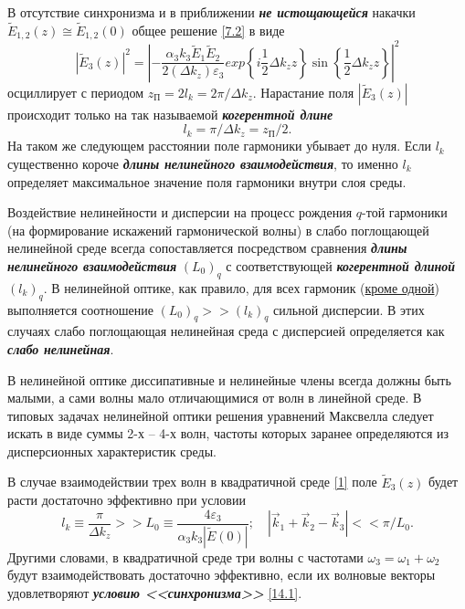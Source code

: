 \documentclass[a4paper]{article}
\begin{document}
 	В отсутствие синхронизма и в приближении \textit{\textbf{не истощающейся}} накачки $\tilde{E}_{1,2}(z)\cong\tilde{E}_{1,2}(0)$ общее решение \eqref{7.2} в виде
 	\begin{equation}
 		\left|\tilde{E}_{3}(z)\right|^{2}=\left|-\frac{\alpha_{3}k_{3}\tilde{E}_{1}\tilde{E}_{2}}{2(\Delta k_{z})\varepsilon_{3}}exp\left\{i\frac{1}{2}\Delta k_{z}z\right\}\sin\left\{\frac{1}{2}\Delta k_{z}z\right\}\right|^{2}
 	\end{equation}
 	осциллирует с периодом $z_{\text{П}}=2l_{k}=2\pi/\Delta k_{z}$. Нарастание поля $|\tilde{E}_{3}(z)|$ происходит только на так называемой \textit{\textbf{когерентной длине}}  
 	\begin{equation}
 		l_{k}=\pi/\Delta k_{z}=z_{\text{П}}/2.
 	\end{equation}
 	На таком же следующем расстоянии поле гармоники убывает до нуля. Если $l_{k}$ существенно короче \textbf{\textit{длины нелинейного взаимодействия}}, то именно $l_{k}$ определяет максимальное значение поля гармоники внутри слоя среды. 
 	
 	Воздействие нелинейности и дисперсии на процесс рождения  $q$-той гармоники (на формирование искажений гармонической волны) в слабо поглощающей нелинейной среде всегда сопоставляется посредством сравнения \textit{\textbf{длины нелинейного взаимодействия}}  $(L_{0})_{q}$  с соответствующей \textit{\textbf{когерентной длиной}} $(l_{k})_{q}$. В нелинейной оптике, как правило, для всех гармоник (\underline{кроме одной}) выполняется соотношение  $(L_{0})_{q}>>(l_{k})_{q}$ сильной дисперсии. В этих случаях слабо поглощающая нелинейная среда с дисперсией определяется как \textbf{\textit{слабо нелинейная}}. 
 	
 	В нелинейной оптике диссипативные и нелинейные члены всегда должны быть малыми, а сами волны мало отличающимися от волн в линейной среде. В типовых задачах нелинейной оптики решения уравнений Максвелла следует искать в виде суммы  2-х – 4-х волн, частоты которых заранее определяются из дисперсионных характеристик среды. 
 	
 	В случае взаимодействии трех волн в квадратичной среде \eqref{1} поле $\tilde{E}_{3}(z)$ будет расти достаточно эффективно при условии  
 	\begin{equation}
 		l_{k}\equiv\frac{\pi}{\Delta k_{z}}>>L_{0}\equiv\frac{4\varepsilon_{3}}{\alpha_{3}k_{3}\left|\tilde{E}(0)\right|};\quad\left|\vec{k}_{1}+\vec{k}_{2}-\vec{k}_{3}\right|<<\pi/L_{0}.
 		\label{14.1}
 	\end{equation}
 	Другими словами, в квадратичной среде три волны с частотами $\omega_{3}=\omega_{1}+\omega_{2}$ будут взаимодействовать достаточно эффективно, если их волновые векторы удовлетворяют \textit{\textbf{условию <<синхронизма>>}} \eqref{14.1}. 
 	
\end{document}
